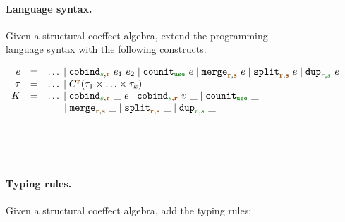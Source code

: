 \begin{figure}[t]
\paragraph{Language syntax.}
Given a structural coeffect algebra, extend the programming language syntax with the following
constructs:

\begin{equation*}
\begin{array}{rcl}
  e &  =  &\ldots \sep\ident{cobind}_{\cclrd{s},\aclrd{\textbf{r}}}~e_1~e_2 \sep \ident{counit}_{\cunit}~e \sep \ident{merge}_{\aclrd{\textbf{r}},\aclrd{\textbf{s}}}~e
         \sep \ident{split}_{\aclrd{\textbf{r}},\aclrd{\textbf{s}}}~e \sep \ident{dup}_{\cclrd{r},\cclrd{s}}~e \\
  \tau &  = &\ldots \sep \ctyp{\aclrd{\textbf{r}}}{(\tau_1 \times \ldots \times \tau_k)} \\
  K  & = &\ldots \sep \ident{cobind}_{\cclrd{s},\aclrd{\textbf{r}}}~\_~e \sep \ident{cobind}_{\cclrd{s},\aclrd{\textbf{r}}}~v~\_ \sep \ident{counit}_{\cunit}~\_ \\
    && \hspace{1.4em} \sep \ident{merge}_{\aclrd{\textbf{r}},\aclrd{\textbf{s}}}~\_
           \sep \ident{split}_{\aclrd{\textbf{r}},\aclrd{\textbf{s}}}~\_ \sep \ident{dup}_{\cclrd{r},\cclrd{s}}~\_ \\
\end{array}
\end{equation*}

~

~

\paragraph{Typing rules.}
Given a structural coeffect algebra, add the typing rules:


\end{figure}
